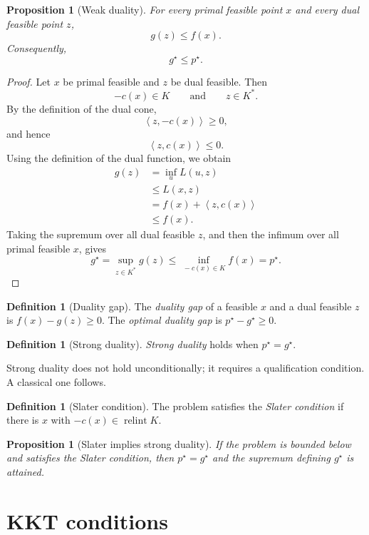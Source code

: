 \documentclass[a4paper,11pt]{book}
\theoremstyle{plain}
\newtheorem{proposition}[theorem]{Proposition}
\theoremstyle{definition}
\newtheorem{definition}[theorem]{Definition}
\theoremstyle{remark}
\numberwithin{equation}{chapter}
\numberwithin{algorithm}{chapter}
\newcommand{\inner}[2]{\left\langle #1, #2 \right\rangle}
\newcommand{\relint}{\operatorname{relint}}
\begin{document}
	\begin{proposition}[Weak duality]
		For every primal feasible point \(x\) and every dual feasible point \(z\),
		\[
		g(z)\leq f(x).
		\]
		Consequently,
		\[
		g^\star\leq p^\star.
		\]
	\end{proposition}
	
	\begin{proof}
		Let \(x\) be primal feasible and \(z\) be dual feasible. Then
		\[
		-c(x)\in K
		\qquad\text{and}\qquad
		z\in K^*.
		\]
		By the definition of the dual cone,
		\[
		\inner{z}{-c(x)}\geq0,
		\]
		and hence
		\[
		\inner{z}{c(x)}\leq0.
		\]
		Using the definition of the dual function, we obtain
		\begin{align}
			g(z)
			&=\inf_u L(u,z)\\
			&\leq L(x,z)\\
			&=f(x)+\inner{z}{c(x)}\\
			&\leq f(x).
		\end{align}
		Taking the supremum over all dual feasible \(z\), and then the infimum over
		all primal feasible \(x\), gives
		\[
		g^\star
		=
		\sup_{z\in K^*}g(z)
		\leq
		\inf_{\,-c(x)\in K}f(x)
		=
		p^\star.
		\]
	\end{proof}
	
	\begin{definition}[Duality gap]
		The \emph{duality gap} of a feasible $x$ and a dual feasible $z$ is
		$f(x)-g(z)\geq0$. The \emph{optimal duality gap} is $p^\star-g^\star\geq0$.
	\end{definition}
	
	\begin{definition}[Strong duality]
		\emph{Strong duality} holds when $p^\star=g^\star$.
	\end{definition}
	
	Strong duality does not hold unconditionally; it requires a qualification
	condition. A classical one follows.
	\begin{definition}[Slater condition]
		The problem satisfies the \emph{Slater condition} if there is $x$ with
		$-c(x)\in\relint K$.
	\end{definition}
	
	\begin{proposition}[Slater implies strong duality]
		If the problem is bounded below and satisfies the Slater condition, then
		$p^\star=g^\star$ and the supremum defining $g^\star$ is attained.
	\end{proposition}
	
	\section{KKT conditions}
	
\end{document}

